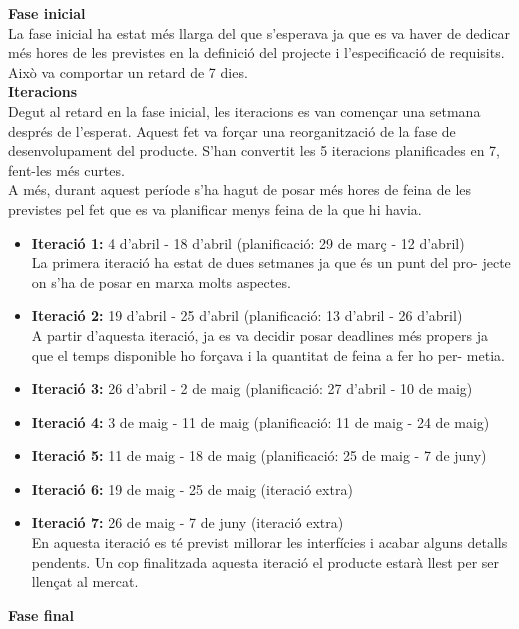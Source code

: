 \textbf{Fase inicial}\\

La fase inicial ha estat més llarga del que s'esperava ja que es va haver de dedicar més hores de les previstes en la definició del projecte i l'especificació de
requisits. Això va comportar un retard de 7 dies.\\

\textbf{Iteracions}\\

Degut al retard en la fase inicial, les iteracions es van començar una setmana després de l'esperat. Aquest fet va forçar una reorganització de la fase de
desenvolupament del producte. S'han convertit les 5 iteracions planificades en
7, fent-les més curtes.\\
A més, durant aquest període s'ha hagut de posar més hores de feina de les
previstes pel fet que es va planificar menys feina de la que hi havia.
\begin{itemize}
\item{}\textbf{Iteració 1:} 4 d'abril - 18 d'abril (planificació: 29 de març - 12 d'abril)\\
La primera iteració ha estat de dues setmanes ja que és un punt del pro-
jecte on s'ha de posar en marxa molts aspectes.
\item{}\textbf{Iteració 2:} 19 d'abril - 25 d'abril (planificació: 13 d'abril - 26 d'abril)\\
A partir d'aquesta iteració, ja es va decidir posar deadlines més propers
ja que el temps disponible ho forçava i la quantitat de feina a fer ho per-
metia.
\item{}\textbf{Iteració 3:} 26 d'abril - 2 de maig (planificació: 27 d'abril - 10 de maig)
\item{}\textbf{Iteració 4:} 3 de maig - 11 de maig (planificació: 11 de maig - 24 de maig)
\item{}\textbf{Iteració 5:} 11 de maig - 18 de maig (planificació: 25 de maig - 7 de juny)
\item{}\textbf{Iteració 6:} 19 de maig - 25 de maig (iteració extra)
\item{}\textbf{Iteració 7:} 26 de maig - 7 de juny (iteració extra)\\
En aquesta iteració es té previst millorar les interfícies i acabar alguns detalls pendents. Un cop finalitzada aquesta iteració el producte estarà llest
per ser llençat al mercat.
\end{itemize}

\textbf{Fase final}\\

